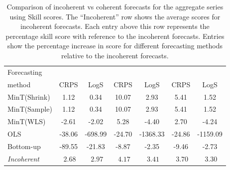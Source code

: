 \documentclass[a4paper, 11pt]{article}
\def\mathbi#1{\textit{ #1}}
\begin{document}
\begin{table}
  \caption{Comparison of incoherent vs coherent forecasts for the aggregate series using Skill scores. The ``Incoherent'' row shows the average scores for incoherent forecasts. Each entry above this row represents the percentage skill score with reference to the incoherent forecasts. Entries show the percentage increase in score for different forecasting methods relative to the incoherent forecasts.}\label{table:4}
  \centering\small
  \begin{tabular}{@{}lSSSSSS@{}}
    \toprule
    Forecasting &
     &
     &
     \\
    \cmidrule(lr){2-3} \cmidrule(lr){4-5} \cmidrule(l){6-7}
    method      &  CRPS   & LogS    & CRPS   & LogS     & CRPS   & LogS     \\
    \midrule
    MinT(Shrink) & 1.12   & 0.34    & 10.07  & 2.93     & 5.41   & 1.52     \\
    MinT(Sample) & 1.12   & 0.34    & 10.07  & 2.93     & 5.41   & 1.52     \\
    MinT(WLS)    & -2.61  & -2.02   & 5.28   & -4.40    & 2.70   & -4.24    \\
    OLS          & -38.06 & -698.99 & -24.70 & -1368.33 & -24.86 & -1159.09 \\
    Bottom-up    & -89.55 & -21.83  & -8.87  & -2.35    & -9.46  & -2.73    \\
    \midrule
    \textit{Incoherent} & $\mathbi{2.68}$ & $\mathbi{2.97}$ & $\mathbi{4.17}$ & $\mathbi{3.41}$ & $\mathbi{3.70}$ & $\mathbi{3.30}$ \\
    \bottomrule
  \end{tabular}
\end{table}
\end{document}
